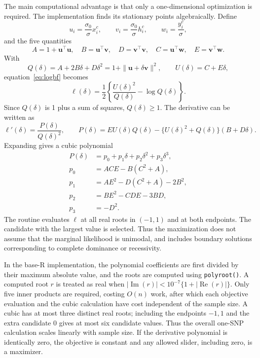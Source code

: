 \documentclass[11pt]{article}
\begin{document}
The main computational advantage is that only a one-dimensional
optimization is required. The implementation finds its stationary
points algebraically. Define
\begin{equation}
u_i=\frac{\sigma_0}{\sigma}x_i^c,\qquad
v_i=\frac{\sigma_0}{\sigma}h_i^c,\qquad
w_i=\frac{y_i^c}{\sigma},
\end{equation}
and the five quantities
\begin{equation}
A=1+\mathbf u^\top\mathbf u,\quad
B=\mathbf u^\top\mathbf v,\quad
D=\mathbf v^\top\mathbf v,\quad
C=\mathbf u^\top\mathbf w,\quad
E=\mathbf v^\top\mathbf w.
\end{equation}
With
\begin{equation}
Q(\delta)=A+2B\delta+D\delta^2
          =1+\|\mathbf u+\delta\mathbf v\|^2,
\qquad U(\delta)=C+E\delta,
\end{equation}
equation~\eqref{eq:logbf} becomes
\begin{equation}
\ell(\delta)=\frac12\left\{\frac{U(\delta)^2}{Q(\delta)}
                                      -\log Q(\delta)\right\}.
\end{equation}
Since $Q(\delta)$ is 1 plus a sum of squares, $Q(\delta)\geq1$.
The derivative can be written as
\begin{equation}
\ell'(\delta)=\frac{P(\delta)}{Q(\delta)^2},\qquad
P(\delta)=EU(\delta)Q(\delta)
 -\{U(\delta)^2+Q(\delta)\}(B+D\delta).
\end{equation}
Expanding gives a cubic polynomial
\begin{align}
P(\delta)&=p_0+p_1\delta+p_2\delta^2+p_3\delta^3,\\
p_0&=ACE-B(C^2+A),\\
p_1&=AE^2-D(C^2+A)-2B^2,\\
p_2&=BE^2-CDE-3BD,\\
p_3&=-D^2.
\label{eq:cubic}
\end{align}
The routine evaluates $\ell$ at all real roots in $(-1,1)$ and
at both endpoints. The candidate with the largest value is selected.
Thus the maximization does not assume that the marginal likelihood is
unimodal, and includes boundary solutions corresponding to complete
dominance or recessivity.

In the base-R implementation, the polynomial coefficients are first
divided by their maximum absolute value, and the roots are computed
using \texttt{polyroot()}. A computed root $r$ is treated as real when
$|\operatorname{Im}(r)|<10^{-7}\{1+|\operatorname{Re}(r)|\}$.
Only five inner products are required, costing $O(n)$ work, after
which each objective evaluation and the cubic calculation have cost
independent of the sample size. A cubic has at most three distinct
real roots; including the endpoints $-1,1$ and the extra candidate
$0$ gives at most six candidate values. Thus the overall one-SNP
calculation scales linearly with sample size. If the derivative
polynomial is identically zero, the objective is constant and any
allowed slider, including zero, is a maximizer.
\end{document}
